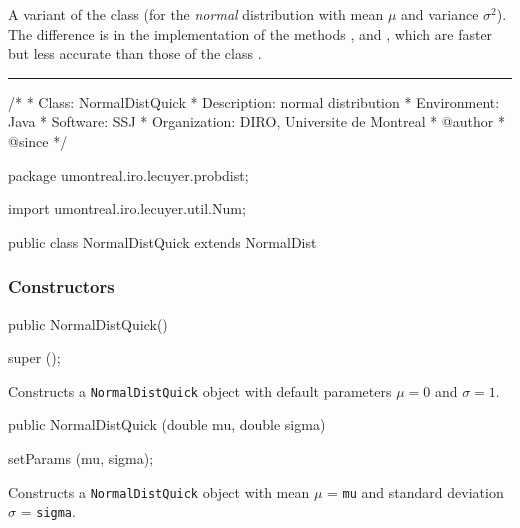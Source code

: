 
A variant of the class  (for the {\em normal\/} 
distribution with mean $\mu$ and variance $\sigma^2$).
The difference is in the implementation of the methods ,
 and , which are faster
but less accurate than those of the class . 
 

\bigskip\hrule

\begin{code}
\begin{hide}
/*
 * Class:        NormalDistQuick
 * Description:  normal distribution
 * Environment:  Java
 * Software:     SSJ 
 * Organization: DIRO, Universite de Montreal
 * @author       
 * @since
 */
\end{hide}
package umontreal.iro.lecuyer.probdist;\begin{hide}
import umontreal.iro.lecuyer.util.Num;\end{hide}

public class NormalDistQuick extends NormalDist \begin{hide} {
\end{hide}
\end{code}
\subsubsection* {Constructors}

\begin{code}

   public NormalDistQuick()\begin{hide} {
      super ();
   }\end{hide}
\end{code}
 \begin{tabb}
 Constructs a \texttt{NormalDistQuick} object with default parameters $\mu = 0$ 
 and $\sigma = 1$.   
 \end{tabb}
\begin{code}

   public NormalDistQuick (double mu, double sigma)\begin{hide} {
      setParams (mu, sigma);
   }\end{hide}
\end{code}
\begin{tabb}
 Constructs a \texttt{NormalDistQuick} object with mean $\mu$ = \texttt{mu} 
 and  standard deviation $\sigma$ = \texttt{sigma}.   
 \end{tabb}

